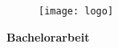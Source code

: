 \begin{titlingpage}

\begingroup
\begin{figure}[h!]
    \centering
	\texttt{[image: logo]}
\end{figure}
\let\newpage\relax%
\center\huge{\textbf{Bachelorarbeit}}
\maketitle
\endgroup

\end{titlingpage}

\tableofcontents
\listoffigures